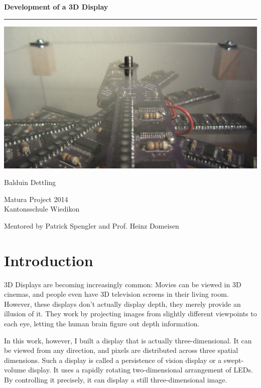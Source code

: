 \documentclass[a4paper, 11pt, titlepage]{article}
\begin{document}
\begin{titlepage}

    \centering
    \vspace*{3cm}
    {\huge\bfseries Development of a 3D Display}
    \rule{0.67\textwidth}{1.5pt}
    \vspace*{2cm}

    \centerline{\includegraphics[width=0.9\paperwidth]{./images/cover.jpg}}

    \vspace*{1cm}
    \Large
    Balduin Dettling

    \large
    Matura Project 2014 \\ Kantonsschule Wiedikon

    Mentored by Patrick Spengler and Prof. Heinz Domeisen
    \vfill

\end{titlepage}


\section{Introduction}


3D Displays are becoming increasingly common: Movies can be viewed in 3D cinemas, and people even
have 3D television screens in their living room. However, these displays don't actually display
depth, they merely provide an illusion of it. They work by projecting images from slightly
different viewpoints to each eye, letting the human brain figure out depth information.

In this work, however, I built a display that is actually three-dimensional. It can be viewed from
any direction, and pixels are distributed across three spatial dimensions. Such a display is
called a persistence of vision display or a swept-volume display. It uses a rapidly rotating
two-dimensional arrangement of LEDs. By controlling it precisely, it can display a still
three-dimensional image.
\end{document}

